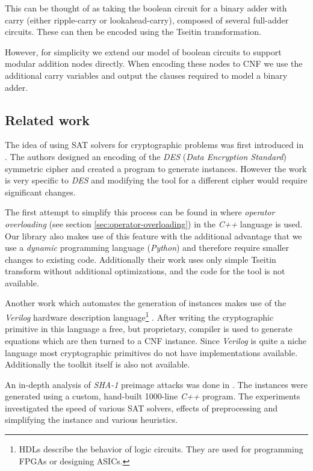This can be thought of as taking the boolean circuit for a binary adder with carry (either ripple-carry or lookahead-carry), composed of several full-adder circuits.
These can then be encoded using the Tseitin transformation.

However, for simplicity we extend our model of boolean circuits to support modular addition nodes directly.
When encoding these nodes to CNF we use the additional carry variables and output the clauses required to model a binary adder.


\subsection{Related work}
\label{sec:related-work}
The idea of using SAT solvers for cryptographic problems was first introduced in \cite{massacci2000logical}.
The authors designed an encoding of the \emph{DES} (\emph{Data Encryption Standard}) symmetric cipher and created a program to generate instances.
However the work is very specific to \emph{DES} and modifying the tool for a different cipher would require significant changes.

The first attempt to simplify this process can be found in \cite{jovanovic2005logical} where \emph{operator overloading} (see section \ref{sec:operator-overloading}) in the \emph{C++} language is used.
Our library also makes use of this feature with the additional advantage that we use a \emph{dynamic} programming language (\emph{Python}) and therefore require smaller changes to existing code.
Additionally their work uses only simple Tseitin transform without additional optimizations, and the code for the tool is not available.

Another work which automates the generation of instances makes use of the \emph{Verilog} hardware description language\footnote{HDLs describe the behavior of logic circuits. They are used for programming FPGAs or designing ASICs.} \cite{morawiecki2013sat}.
After writing the cryptographic primitive in this language a free, but proprietary, compiler is used to generate equations which are then turned to a CNF instance.
Since \emph{Verilog} is quite a niche language most cryptographic primitives do not have implementations available.
Additionally the toolkit itself is also not available.

An in-depth analysis of \emph{SHA-1} preimage attacks was done in \cite{nossum2012sat}.
The instances were generated using a custom, hand-built 1000-line \emph{C++} program.
The experiments investigated the speed of various SAT solvers, effects of preprocessing and simplifying the instance and various heuristics.

